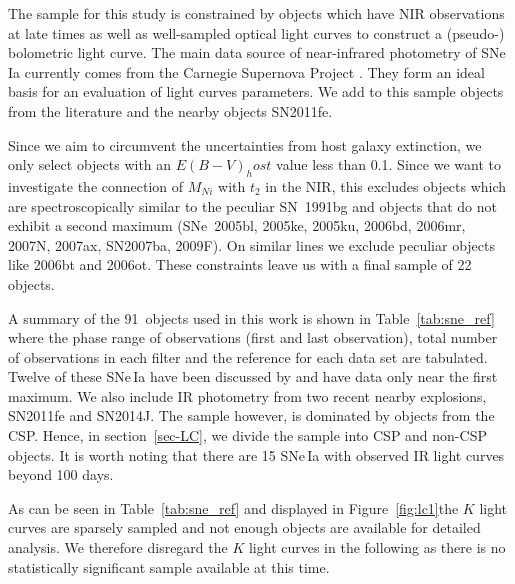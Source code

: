 \documentclass{aa}
\begin{document}
The sample for this study is constrained by objects which have NIR observations at late times as well as well-sampled optical light curves to
construct a (pseudo-) bolometric light curve. The main data source of
near-infrared photometry of SNe\,Ia currently comes from the Carnegie
Supernova Project \citep[CSP;][]{Contreras2010,Burns2011,Stritzinger2011,Phillips2012,Burns2014}.
They form an ideal basis for an evaluation of light curves parameters.
We add to this sample objects from the literature and the nearby objects SN2011fe.


Since we aim to circumvent the uncertainties from host galaxy extinction, we only select objects with an $E(B-V)_host$ value
less than 0.1. Since we want to investigate the connection of $M_{Ni}$ with $t_2$ in the NIR, this excludes objects which are spectroscopically similar  
to the
peculiar SN~1991bg \citep{Filippenko1992, Leibundgut1993, Mazzali1997} and
objects that do not exhibit a second maximum
(SNe~2005bl, 2005ke, 2005ku, 2006bd, 2006mr, 2007N, 2007ax, SN2007ba,
2009F). On similar lines we exclude peculiar objects like 2006bt and 2006ot. 
These constraints leave us with a final sample of 22 objects. 


 
\iffalse
A summary of the 91~objects used in this work is shown in
Table~\ref{tab:sne_ref} where the phase range of observations
(first and last observation), total number of observations in each
filter and the reference for each data set are tabulated. Twelve of these SNe\,Ia
have been discussed by \citet{BN12} and have data only near the first
maximum. We also include IR photometry from two recent nearby
explosions, SN2011fe and SN2014J. The sample however, is dominated by objects
from the CSP. Hence, in section~\ref{sec-LC}, we divide the sample
into CSP and non-CSP objects. It is worth noting that there are 15 SNe\,Ia
with observed IR light curves beyond 100 days.

As can be seen in Table~\ref{tab:sne_ref} and displayed in
Figure~\ref{fig:lc1}the $K$ light curves are sparsely sampled  and
not enough objects are available for detailed analysis. We therefore 
disregard the $K$ light curves in the following as there is no
statistically significant sample available at this time.
\end{document}
